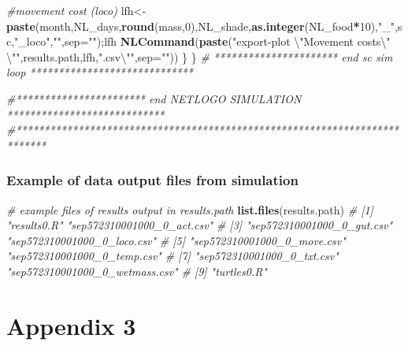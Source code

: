 \documentclass[]{article}
\newenvironment{Shaded}{\begin{snugshade}}{\end{snugshade}}
\newcommand{\KeywordTok}[1]{\textcolor[rgb]{0.13,0.29,0.53}{\textbf{#1}}}
\newcommand{\DataTypeTok}[1]{\textcolor[rgb]{0.13,0.29,0.53}{#1}}
\newcommand{\DecValTok}[1]{\textcolor[rgb]{0.00,0.00,0.81}{#1}}
\newcommand{\CharTok}[1]{\textcolor[rgb]{0.31,0.60,0.02}{#1}}
\newcommand{\StringTok}[1]{\textcolor[rgb]{0.31,0.60,0.02}{#1}}
\newcommand{\CommentTok}[1]{\textcolor[rgb]{0.56,0.35,0.01}{\textit{#1}}}
\newcommand{\OperatorTok}[1]{\textcolor[rgb]{0.81,0.36,0.00}{\textbf{#1}}}
\newcommand{\NormalTok}[1]{#1}
\let\oldsubparagraph\subparagraph
\renewcommand{\subparagraph}[1]{\oldsubparagraph{#1}\mbox{}}
\begin{document}
\begin{Shaded}
\begin{Highlighting}[]
        \CommentTok{#movement cost (loco) }
\NormalTok{        lfh<-}\KeywordTok{paste}\NormalTok{(month,NL_days,}\KeywordTok{round}\NormalTok{(mass,}\DecValTok{0}\NormalTok{),NL_shade,}\KeywordTok{as.integer}\NormalTok{(NL_food}\OperatorTok{*}\DecValTok{10}\NormalTok{),}\StringTok{"_"}\NormalTok{,sc,}\StringTok{"_loco"}\NormalTok{,}\StringTok{""}\NormalTok{,}\DataTypeTok{sep=}\StringTok{""}\NormalTok{);lfh}
        \KeywordTok{NLCommand}\NormalTok{(}\KeywordTok{paste}\NormalTok{(}\StringTok{"export-plot }\CharTok{\textbackslash{}"}\StringTok{Movement costs}\CharTok{\textbackslash{}"}\StringTok{ }\CharTok{\textbackslash{}"}\StringTok{"}\NormalTok{,results.path,lfh,}\StringTok{".csv}\CharTok{\textbackslash{}"}\StringTok{"}\NormalTok{,}\DataTypeTok{sep=}\StringTok{""}\NormalTok{))}
\NormalTok{    \}}
\NormalTok{\} }\CommentTok{# ********************** end sc sim loop *****************************}

\CommentTok{#*********************** end NETLOGO SIMULATION ****************************}
\CommentTok{#***************************************************************************}
\end{Highlighting}
\end{Shaded}

\subsubsection{Example of data output files from
simulation}\label{example-of-data-output-files-from-simulation}

\begin{Shaded}
\begin{Highlighting}[]
\CommentTok{# example files of results output in results.path}
\KeywordTok{list.files}\NormalTok{(results.path)}
\CommentTok{# [1] "results0.R"                    "sep572310001000_0_act.csv"    }
\CommentTok{# [3] "sep572310001000_0_gut.csv"     "sep572310001000_0_loco.csv"   }
\CommentTok{# [5] "sep572310001000_0_move.csv"    "sep572310001000_0_temp.csv"   }
\CommentTok{# [7] "sep572310001000_0_txt.csv"     "sep572310001000_0_wetmass.csv"}
\CommentTok{# [9] "turtles0.R"   }
\end{Highlighting}
\end{Shaded}

\subparagraph{}\label{section-6}

\section{Appendix 3}\label{appendix-3}
\end{document}
